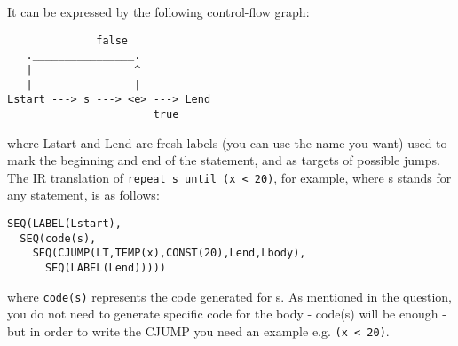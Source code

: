 \documentclass[11pt]{article}
\newcommand{\syntax}[1]{\texttt{#1}}
\begin{document}
\begin{enumerate}
It can be expressed by the following control-flow graph:
\begin{verbatim}
              false
   .________________.
   |                ^
   |                |
Lstart ---> s ---> <e> ---> Lend
                       true
\end{verbatim}
where Lstart and Lend are fresh labels (you can use the name you want) used to mark the beginning and end of the statement, and as targets of possible jumps. The IR translation of \syntax{repeat s until (x < 20)}, for example, where s stands for any statement, is as follows:
\begin{verbatim}
SEQ(LABEL(Lstart),
  SEQ(code(s),
    SEQ(CJUMP(LT,TEMP(x),CONST(20),Lend,Lbody),
      SEQ(LABEL(Lend)))))
\end{verbatim}
where \verb+code(s)+ represents the code generated for s. As mentioned in the question, you do not need to generate specific code for the body - code(s) will be enough - but in order to write the CJUMP you need an example e.g. \verb+(x < 20)+.



\end{enumerate}
\end{document}
